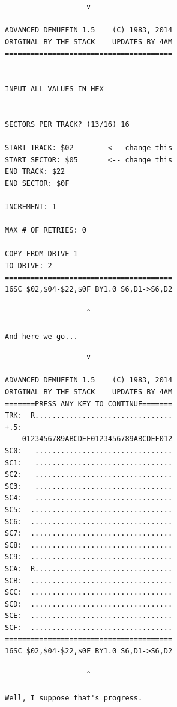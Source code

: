 \documentclass{article}
\begin{document}
\begin{verbatim}
                 --v--

ADVANCED DEMUFFIN 1.5    (C) 1983, 2014
ORIGINAL BY THE STACK    UPDATES BY 4AM
=======================================


INPUT ALL VALUES IN HEX


SECTORS PER TRACK? (13/16) 16

START TRACK: $02        <-- change this
START SECTOR: $05       <-- change this
END TRACK: $22
END SECTOR: $0F

INCREMENT: 1

MAX # OF RETRIES: 0

COPY FROM DRIVE 1
TO DRIVE: 2
=======================================
16SC $02,$04-$22,$0F BY1.0 S6,D1->S6,D2

                 --^--

And here we go...
\end{verbatim}

\newpage

\begin{verbatim}
                 --v--

ADVANCED DEMUFFIN 1.5    (C) 1983, 2014
ORIGINAL BY THE STACK    UPDATES BY 4AM
=======PRESS ANY KEY TO CONTINUE=======
TRK:  R................................
+.5:
    0123456789ABCDEF0123456789ABCDEF012
SC0:   ................................
SC1:   ................................
SC2:   ................................
SC3:   ................................
SC4:   ................................
SC5:  .................................
SC6:  .................................
SC7:  .................................
SC8:  .................................
SC9:  .................................
SCA:  R................................
SCB:  .................................
SCC:  .................................
SCD:  .................................
SCE:  .................................
SCF:  .................................
=======================================
16SC $02,$04-$22,$0F BY1.0 S6,D1->S6,D2

                 --^--

Well, I suppose that's progress.
\end{verbatim}

\vspace*{\fill}
\end{document}
